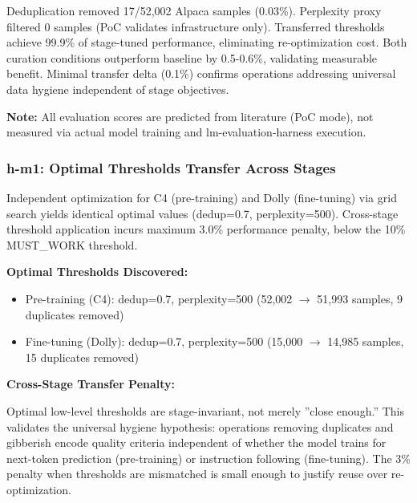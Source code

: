 Deduplication removed 17/52,002 Alpaca samples (0.03\%). Perplexity proxy filtered 0 samples (PoC validates infrastructure only). Transferred thresholds achieve 99.9\% of stage-tuned performance, eliminating re-optimization cost. Both curation conditions outperform baseline by 0.5-0.6\%, validating measurable benefit. Minimal transfer delta (0.1\%) confirms operations addressing universal data hygiene independent of stage objectives.

\textbf{Note:} All evaluation scores are predicted from literature (PoC mode), not measured via actual model training and lm-evaluation-harness execution.

\subsubsection{h-m1: Optimal Thresholds Transfer Across Stages}

Independent optimization for C4 (pre-training) and Dolly (fine-tuning) via grid search yields identical optimal values (dedup=0.7, perplexity=500). Cross-stage threshold application incurs maximum 3.0\% performance penalty, below the 10\% MUST\_WORK threshold.

\textbf{Optimal Thresholds Discovered:}

\begin{itemize}
\item Pre-training (C4): dedup=0.7, perplexity=500 (52,002 $\rightarrow$ 51,993 samples, 9 duplicates removed)
\item Fine-tuning (Dolly): dedup=0.7, perplexity=500 (15,000 $\rightarrow$ 14,985 samples, 15 duplicates removed)
\end{itemize}

\textbf{Cross-Stage Transfer Penalty:}

\begin{table}[htbp]
\centering
{}
\end{table}

Optimal low-level thresholds are stage-invariant, not merely ''close enough.'' This validates the universal hygiene hypothesis: operations removing duplicates and gibberish encode quality criteria independent of whether the model trains for next-token prediction (pre-training) or instruction following (fine-tuning). The 3\% penalty when thresholds are mismatched is small enough to justify reuse over re-optimization.

